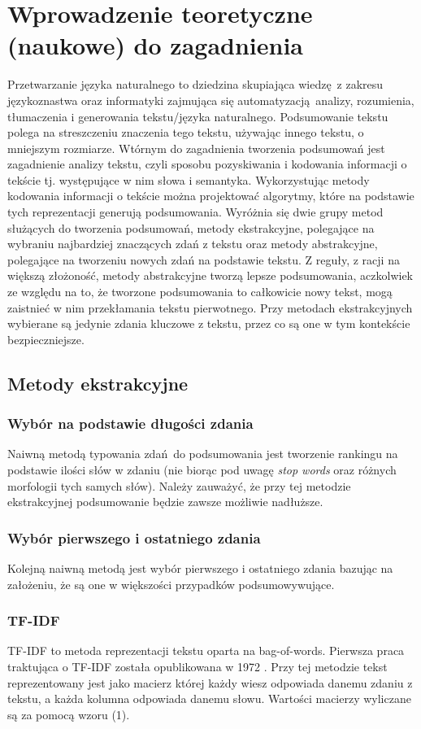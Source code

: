 \documentclass{article}
\begin{document}
\section{Wprowadzenie teoretyczne (naukowe) do zagadnienia}
Przetwarzanie języka naturalnego to dziedzina skupiająca wiedzę z zakresu
językoznastwa oraz informatyki zajmująca się automatyzacją analizy, rozumienia,
tłumaczenia i generowania tekstu/języka naturalnego.
Podsumowanie tekstu polega na streszczeniu znaczenia tego tekstu, używając
innego tekstu, o mniejszym rozmiarze. Wtórnym do zagadnienia tworzenia podsumowań
jest zagadnienie analizy tekstu, czyli sposobu pozyskiwania i kodowania informacji o tekście
tj. występujące w nim słowa i semantyka. Wykorzystując metody kodowania informacji o tekście
można projektować algorytmy, które na podstawie tych reprezentacji generują podsumowania.
Wyróżnia się dwie grupy metod służących do tworzenia podsumowań, metody ekstrakcyjne,
polegające na wybraniu najbardziej znaczących zdań z tekstu oraz metody abstrakcyjne,
polegające na tworzeniu nowych zdań na podstawie tekstu. Z reguły, z racji na większą złożoność,
metody abstrakcyjne tworzą lepsze podsumowania, aczkolwiek ze względu na to, że tworzone
podsumowania to całkowicie nowy tekst, mogą zaistnieć w nim przekłamania tekstu pierwotnego. Przy metodach
ekstrakcyjnych wybierane są jedynie zdania kluczowe z tekstu, przez co są one w tym kontekście bezpieczniejsze.

\subsection{Metody ekstrakcyjne}
\subsubsection{Wybór na podstawie długości zdania}
Naiwną metodą typowania zdań do podsumowania jest tworzenie rankingu na podstawie
ilości słów w zdaniu (nie biorąc pod uwagę \textit{stop words} oraz różnych morfologii 
tych samych słów). Należy zauważyć, że przy tej metodzie ekstrakcyjnej podsumowanie
będzie zawsze możliwie nadłuższe.
\subsubsection{Wybór pierwszego i ostatniego zdania}
Kolejną naiwną metodą jest wybór pierwszego i ostatniego zdania bazując na założeniu, że
są one w większości przypadków podsumowywujące.
\subsubsection{TF-IDF}
TF-IDF to metoda reprezentacji tekstu oparta na bag-of-words. Pierwsza praca traktująca
o TF-IDF została opublikowana w 1972 \cite{sparckjones1972statistical}. Przy tej metodzie tekst 
reprezentowany jest jako macierz której każdy wiesz odpowiada danemu zdaniu z tekstu, a 
każda kolumna odpowiada danemu słowu. Wartości macierzy wyliczane są za pomocą wzoru (1).
\end{document}
